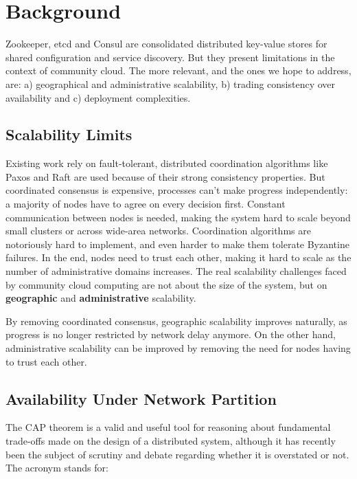 \documentclass{sig-alternate}
\begin{document}
\section{Background}

Zookeeper, etcd and Consul are consolidated distributed key-value stores for shared configuration and service discovery. But they present limitations in the context of community cloud. The more relevant, and the ones we hope to address, are: a) geographical and administrative scalability, b) trading consistency over availability and c) deployment complexities.

\subsection{Scalability Limits}

Existing work rely on fault-tolerant, distributed coordination algorithms like Paxos\cite{lamport2001paxos} and Raft\cite{ongaro2014search} are used because of their strong consistency properties. But coordinated consensus is expensive, processes can't make progress independently: a majority of nodes have to agree on every decision first. Constant communication between nodes is needed, making the system hard to scale beyond small clusters or across wide-area networks. 
Coordination algorithms are notoriously hard to implement\cite{ongaro2014search}, and even harder to make them tolerate Byzantine failures. In the end, nodes need to trust each other, making it hard to scale as the number of administrative domains increases. The real scalability challenges faced by community cloud computing are not about the size of the system, but on \textbf{geographic} and \textbf{administrative} scalability.


By removing coordinated consensus, geographic scalability improves naturally, as progress is no longer restricted by network delay anymore. On the other hand, administrative scalability can be improved by removing the need for nodes having to trust each other. 

\subsection{Availability Under Network Partition}

The CAP theorem is a valid and useful tool for reasoning about fundamental trade-offs made on the design of a distributed system\cite{brewer2012cap}, although it has recently been the subject of scrutiny and debate regarding whether it is overstated or not\cite{Kleppmann:CAP}. The acronym stands for:
\end{document}
